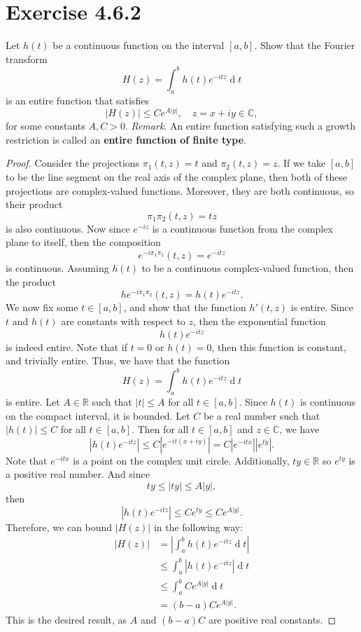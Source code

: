 \documentclass[12pt]{article}
\newenvironment{problem}
    {\begin{lrbox}{\mybox}\begin{minipage}{0.98\textwidth}}
    {\end{minipage}\end{lrbox}\framebox[\textwidth]{\usebox{\mybox}}}
\newcommand{\R}{\mathbb{R}} %
\newcommand{\C}{\mathbb{C}} %
\newcommand{\<}{\left\langle} %
\renewcommand{\>}{\right\rangle} %
\renewcommand{\d}[1]{\operatorname{d}\!#1} %
\begin{document}
\newpage
\section{Exercise 4.6.2}
\begin{problem}
    Let $h(t)$ be a continuous function on the interval $[a, b]$. Show that the Fourier transform
    \[H(z) = \int_a^b h(t) e^{-itz} \d{t}\]
    is an entire function that satisfies
    \[|H(z)| \leq C e^{A|y|}, \quad z = x + iy \in \C,\]
    for some constants $A, C > 0$. \emph{Remark}. An entire function satisfying such a growth restriction is called an \textbf{entire function of finite type}.
\end{problem}

\begin{proof}
    Consider the projections $\pi_1(t, z) = t$ and $\pi_2(t, z) = z$. If we take $[a, b]$ to be the line segment on the real axis of the complex plane, then both of these projections are complex-valued functions. Moreover, they are both continuous, so their product
    \[
        \pi_1\pi_2(t, z) = tz
    \]
    is also continuous. Now since $e^{-iz}$ is a continuous function from the complex plane to itself, then the composition
    \[
        e^{-i\pi_1\pi_2}(t, z) = e^{-itz}
    \]
    is continuous. Assuming $h(t)$ to be a continuous complex-valued function, then the product
    \[
        he^{-i\pi_1\pi_2}(t, z) = h(t)e^{-itz}.
    \]
    We now fix some $t \in [a, b]$, and show that the function $h'(t, z)$ is entire. Since $t$ and $h(t)$ are constants with respect to $z$, then the exponential function
    \[
        h(t)e^{-itz}
    \]
    is indeed entire. Note that if $t = 0$ or $h(t) = 0$, then this function is constant, and trivially entire. Thus, we have that the function
    \[
        H(z) = \int_a^b h(t) e^{-itz} \d{t}
    \]
    is entire. Let $A \in \R$ such that $|t| \leq A$ for all $t \in [a,b]$. Since $h(t)$ is continuous on the compact interval, it is bounded. Let $C$ be a real number such that $|h(t)| \leq C$ for all $t \in [a, b]$. Then for all $t \in [a, b]$ and $z \in \C$, we have
    \[
        \left|h(t) e^{-itz} \right| \leq C \left| e^{-it(x + iy)} \right| = C \left| e^{-itx} \right| \left| e^{ty} \right|.
    \]
    Note that  $e^{-itx}$ is a point on the complex unit circle. Additionally, $ty \in \R$ so $e^{ty}$ is a positive real number. And since
    \[
        ty \leq |ty| \leq A|y|,
    \]
    then
    \[
        \left|h(t) e^{-itz} \right| \leq C e^{ty} \leq C e^{A|y|}.
    \]
    Therefore, we can bound $|H(z)|$ in the following way:
    \begin{align*}
        |H(z)| 
            &= \left| \int_a^b h(t) e^{-itz} \d{t} \right| \\
            &\leq \int_a^b \left| h(t) e^{-itz} \right| \d{t} \\
            &\leq \int_a^b C e^{A|y|} \d{t} \\
            &= (b-a) C e^{A|y|}.
    \end{align*}
    This is the desired result, as $A$ and $(b-a)C$ are positive real constants.
    
\end{proof}
\end{document}
